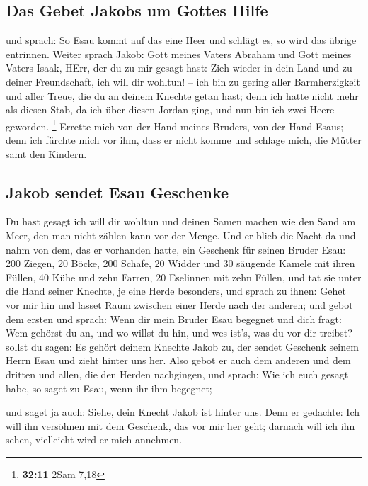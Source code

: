 \hypertarget{das-gebet-jakobs-um-gottes-hilfe}{%
\subsection{Das Gebet Jakobs um Gottes
Hilfe}\label{das-gebet-jakobs-um-gottes-hilfe}}

 und sprach: So Esau kommt auf das eine Heer und schlägt
es, so wird das übrige entrinnen.  Weiter sprach Jakob:
Gott meines Vaters Abraham und Gott meines Vaters Isaak, HErr, der du zu
mir gesagt hast: Zieh wieder in dein Land und zu deiner Freundschaft,
ich will dir wohltun! --  ich bin zu gering aller
Barmherzigkeit und aller Treue, die du an deinem Knechte getan hast;
denn ich hatte nicht mehr als diesen Stab, da ich über diesen Jordan
ging, und nun bin ich zwei Heere geworden. \footnote{\textbf{32:11} 2Sam
  7,18}  Errette mich von der Hand meines Bruders, von
der Hand Esaus; denn ich fürchte mich vor ihm, dass er nicht komme und
schlage mich, die Mütter samt den Kindern.

\hypertarget{jakob-sendet-esau-geschenke}{%
\subsection{Jakob sendet Esau
Geschenke}\label{jakob-sendet-esau-geschenke}}

 Du hast gesagt ich will dir wohltun und deinen Samen
machen wie den Sand am Meer, den man nicht zählen kann vor der Menge.
 Und er blieb die Nacht da und nahm von dem, das er
vorhanden hatte, ein Geschenk für seinen Bruder Esau: 
200 Ziegen, 20 Böcke, 200 Schafe, 20 Widder  und 30
säugende Kamele mit ihren Füllen, 40 Kühe und zehn Farren, 20 Eselinnen
mit zehn Füllen,  und tat sie unter die Hand seiner
Knechte, je eine Herde besonders, und sprach zu ihnen: Gehet vor mir hin
und lasset Raum zwischen einer Herde nach der anderen; 
und gebot dem ersten und sprach: Wenn dir mein Bruder Esau begegnet und
dich fragt: Wem gehörst du an, und wo willst du hin, und wes ist's, was
du vor dir treibst?  sollst du sagen: Es gehört deinem
Knechte Jakob zu, der sendet Geschenk seinem Herrn Esau und zieht hinter
uns her.  Also gebot er auch dem anderen und dem dritten
und allen, die den Herden nachgingen, und sprach: Wie ich euch gesagt
habe, so saget zu Esau, wenn ihr ihm begegnet;

 und saget ja auch: Siehe, dein Knecht Jakob ist hinter
uns. Denn er gedachte: Ich will ihn versöhnen mit dem Geschenk, das vor
mir her geht; darnach will ich ihn sehen, vielleicht wird er mich
annehmen.

